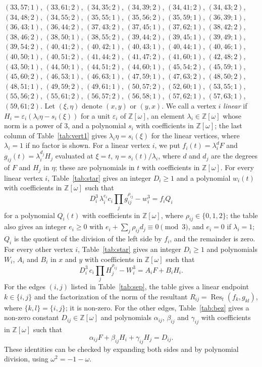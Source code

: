 \documentclass[11pt]{article}
\newcommand{\Z}{\mathbb{Z}}
\begin{document}
$(33,57;1)$, $(33,61;2)$, $(34,35;2)$, $(34,39;2)$, $(34,41;2)$, $(34,43;2)$, $(34,48;2)$, $(34,55;2)$, $(35,55;1)$, $(35,56;2)$, $(35,59;1)$, $(36,39;1)$, $(36,43;1)$, $(36,44;2)$, $(37,43;2)$, $(37,45;1)$, $(37,62;1)$, $(38,42;2)$, $(38,46;2)$, $(38,50;1)$, $(38,55;2)$, $(39,44;2)$, $(39,45;1)$, $(39,49;1)$, $(39,54;2)$, $(40,41;2)$, $(40,42;1)$, $(40,43;1)$, $(40,44;1)$, $(40,46;1)$, $(40,50;1)$, $(40,51;2)$, $(41,44;2)$, $(41,47;2)$, $(41,60;1)$, $(42,48;2)$, $(43,50;1)$, $(44,50;1)$, $(44,51;2)$, $(44,60;1)$, $(45,54;2)$, $(45,59;1)$, $(45,60;2)$, $(46,53;1)$, $(46,63;1)$, $(47,59;1)$, $(47,63;2)$, $(48,50;2)$, $(48,51;1)$, $(49,59;2)$, $(49,61;1)$, $(50,57;2)$, $(52,60;1)$, $(53,55;1)$, $(55,56;2)$, $(55,61;2)$, $(56,57;2)$, $(56,58;1)$, $(57,62;1)$, $(57,63;1)$, $(59,61;2)$.
Let $(\xi,\eta)$ denote $(x,y)$ or $(y,x)$. We call a vertex $i$ \emph{linear} if $H_i=\varepsilon_i(\lambda_i\eta-s_i(\xi))$ for a unit $\varepsilon_i$ of $\Z[\omega]$, an element $\lambda_i\in\Z[\omega]$ whose norm is a power of $3$, and a polynomial $s_i$ with coefficients in $\Z[\omega]$; the last column of Table~\ref{tab:vert1} gives $\lambda_i\eta=s_i(\xi)$ for the linear vertices, where $\lambda_i=1$ if no factor is shown. For a linear vertex $i$, we put $f_i(t)=\lambda_i^{d}F$ and $g_{ij}(t)=\lambda_i^{d_j}H_j$ evaluated at $\xi=t$, $\eta=s_i(t)/\lambda_i$, where $d$ and $d_j$ are the degrees of $F$ and $H_j$ in $\eta$; these are polynomials in $t$ with coefficients in $\Z[\omega]$.
For every linear vertex $i$, Table~\ref{tab:star} gives an integer $D_i\geq1$ and a polynomial $w_i(t)$ with coefficients in $\Z[\omega]$ such that
\begin{equation}\label{eq:starlin}
D_i^3\,\lambda_i^{e_i}c_i\prod_jg_{ij}^{\rho_{ij}}-w_i^3=f_iQ_i
\end{equation}
for a polynomial $Q_i(t)$ with coefficients in $\Z[\omega]$, where $\rho_{ij}\in\{0,1,2\}$; the table also gives an integer $e_i\geq0$ with $e_i+\sum_j\rho_{ij}d_j\equiv0\pmod3$, and $e_i=0$ if $\lambda_i=1$; $Q_i$ is the quotient of the division of the left side by $f_i$, and the remainder is zero.
For every other vertex $i$, Table~\ref{tab:star} gives an integer $D_i\geq1$ and polynomials $W_i$, $A_i$ and $B_i$ in $x$ and $y$ with coefficients in $\Z[\omega]$ such that
\begin{equation}\label{eq:star}
D_i^3\,c_i\prod_jH_j^{\rho_{ij}}-W_i^3=A_iF+B_iH_i.
\end{equation}
For the edges $(i,j)$ listed in Table~\ref{tab:sep}, the table gives a linear endpoint $k\in\{i,j\}$ and the factorization of the norm of the resultant $R_{ij}=\operatorname{Res}_t(f_k,g_{kl})$, where $\{k,l\}=\{i,j\}$; it is non-zero.
For the other edges, Table~\ref{tab:bez} gives a non-zero constant $D_{ij}\in\Z[\omega]$ and polynomials $\alpha_{ij}$, $\beta_{ij}$ and $\gamma_{ij}$ with coefficients in $\Z[\omega]$ such that
\begin{equation}\label{eq:sep}
\alpha_{ij}F+\beta_{ij}H_i+\gamma_{ij}H_j=D_{ij}.
\end{equation}
These identities can be checked by expanding both sides and by polynomial division, using $\omega^2=-1-\omega$.
\end{document}

